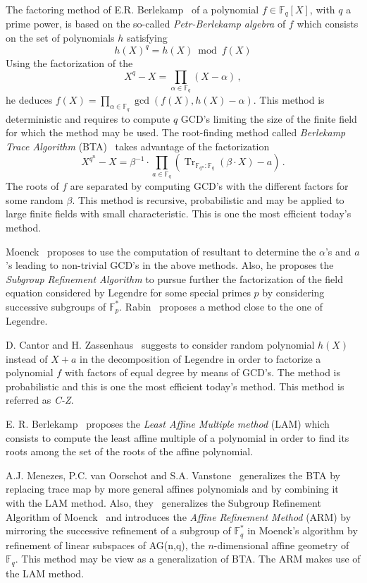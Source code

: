 \documentclass{sig-alternate}
\newcommand{\ff}[1]{\mathbb{F}_{#1}}
\newcommand{\qq}{q}
\newcommand{\nn}{n}
\newcommand{\basef}{\ff{\qq}}
\DeclareMathOperator{\Tr}{Tr}
\newcommand{\tr}[2]{\Tr_{\ff{#1}:\ff{#2}}}
\newcounter{algo}
\begin{document}
The factoring method of E.R. Berlekamp~\cite{berl67} of a polynomial $f \in  \mathbb{F}_\qq[X]$, with $\qq$ a prime power, is based on the so-called \emph{Petr-Berlekamp algebra} of $f$ which consists on the set of polynomials $h$ satisfying  
$$h(X)^q=h(X) \bmod{f(X)}$$
Using the factorization of the 
$$X^{\qq}-X=\prod_{\alpha \in \basef}(X-\alpha)\,,$$
he deduces $f(X)=\prod_{\alpha \in \mathbb{F}_{\qq}} \gcd(f(X),h(X)-\alpha)$. This method is deterministic and requires to compute $\qq$ GCD's limiting the size of the finite field for which the method may be used. The root-finding method called \emph{Berlekamp Trace Algorithm} (BTA)~\cite{berl70} takes advantage of the factorization 
$$X^{\qq^n}-X=\beta^{-1} \cdot \prod_{a \in \basef}(\tr{\qq^n}{\qq}(\beta \cdot X)-a)\,.$$
The roots of $f$ are separated by computing GCD's with the different factors for some random $\beta$. This method is recursive, probabilistic and may be applied to large finite fields with small characteristic. This is one the most efficient today's method.

Moenck~\cite{Moenck77} proposes to use the computation of resultant to determine the $\alpha$'s and $a$'s leading to non-trivial GCD's in the above methods. Also, he proposes the \emph{Subgroup Refinement Algorithm} to pursue further the factorization of the field equation considered by Legendre for some special primes $p$ by considering successive subgroups of $\mathbb{F}_{p}^\ast$. 
Rabin~\cite{Rabin79} proposes a method close to the one of Legendre. 

D. Cantor and H. Zassenhaus~\cite{cantor1981} suggests to consider random polynomial $h(X)$ instead of $X+a$ in the decomposition of Legendre in order to factorize a polynomial $f$ with factors of equal degree by means of GCD's. The method is probabilistic and this is one the most efficient today's method. This method is referred as \emph{C-Z}.

E. R. Berlekamp~\cite{mBER84a} proposes the \emph{Least Affine Multiple method} (LAM) which consists to compute the least affine multiple of a polynomial in order to find its roots among the set of the roots of the affine polynomial. 

A.J. Menezes, P.C. van Oorschot and S.A. Vanstone~\cite{MenezesOV88,OorschotV89} generalizes the BTA by replacing trace map by more general affines polynomials and by combining it with the LAM method. Also, they~\cite{Menvanovans92} generalizes the Subgroup Refinement Algorithm of Moenck~\cite{Moenck77} and 
introduces the \emph{Affine Refinement Method} (ARM) by mirroring the successive refinement of a subgroup of $\mathbb{F}_{\qq}^\ast$ in Moenck's algorithm 
by refinement of linear subspaces of AG(\nn,\qq), the $\nn$-dimensional affine geometry of $\mathbb{F}_{\qq}$. This method may be view as a generalization of BTA. The ARM makes use of the LAM method.
\end{document}
